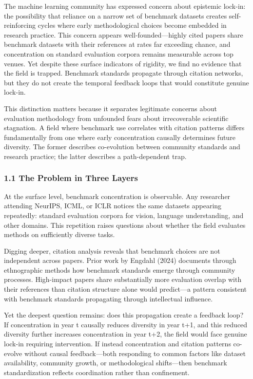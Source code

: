 
The machine learning community has expressed concern about epistemic lock-in: the possibility that reliance on a narrow set of benchmark datasets creates self-reinforcing cycles where early methodological choices become embedded in research practice. This concern appears well-founded---highly cited papers share benchmark datasets with their references at rates far exceeding chance, and concentration on standard evaluation corpora remains measurable across top venues. Yet despite these surface indicators of rigidity, we find no evidence that the field is trapped. Benchmark standards propagate through citation networks, but they do not create the temporal feedback loops that would constitute genuine lock-in.

This distinction matters because it separates legitimate concerns about evaluation methodology from unfounded fears about irrecoverable scientific stagnation. A field where benchmark use correlates with citation patterns differs fundamentally from one where early concentration causally determines future diversity. The former describes co-evolution between community standards and research practice; the latter describes a path-dependent trap.

\subsubsection{1.1 The Problem in Three Layers}

At the surface level, benchmark concentration is observable. Any researcher attending NeurIPS, ICML, or ICLR notices the same datasets appearing repeatedly: standard evaluation corpora for vision, language understanding, and other domains. This repetition raises questions about whether the field evaluates methods on sufficiently diverse tasks.

Digging deeper, citation analysis reveals that benchmark choices are not independent across papers. Prior work by Engdahl (2024) documents through ethnographic methods how benchmark standards emerge through community processes. High-impact papers share substantially more evaluation overlap with their references than citation structure alone would predict---a pattern consistent with benchmark standards propagating through intellectual influence.

Yet the deepest question remains: does this propagation create a feedback loop? If concentration in year t causally reduces diversity in year t+1, and this reduced diversity further increases concentration in year t+2, the field would face genuine lock-in requiring intervention. If instead concentration and citation patterns co-evolve without causal feedback---both responding to common factors like dataset availability, community growth, or methodological shifts---then benchmark standardization reflects coordination rather than confinement.

